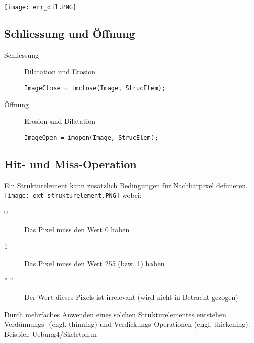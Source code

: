 \texttt{[image: err\_dil.PNG]}

\subsection{Schliessung und Öffnung}
\begin{description}
    \item[Schliessung] Dilatation und Erosion\\
\begin{lstlisting}
ImageClose = imclose(Image, StrucElem);
\end{lstlisting}
    \item[Öffnung] Erosion und Dilatation
\begin{lstlisting}
ImageOpen = imopen(Image, StrucElem);
\end{lstlisting}
\end{description}

\subsection{Hit- und Miss-Operation}
Ein Strukturelement kann zusätzlich Bedingungen für Nachbarpixel definieren.
\texttt{[image: ext\_strukturelement.PNG]}
wobei:
\begin{description}
    \item[0] Das Pixel muss den Wert 0 haben
    \item[1] Das Pixel muss den Wert 255 (bzw. 1) haben
    \item['' ''] Der Wert dieses Pixels ist irrelevant (wird nicht in Betracht gezogen)
\end{description}
Durch mehrfaches Anwenden eines solchen Strukturelementes entstehen Verdünnungs- (engl. thinning) und Verdickungs-Operationen (engl. thickening).\\
Beispiel: Uebung4/Skeleton.m